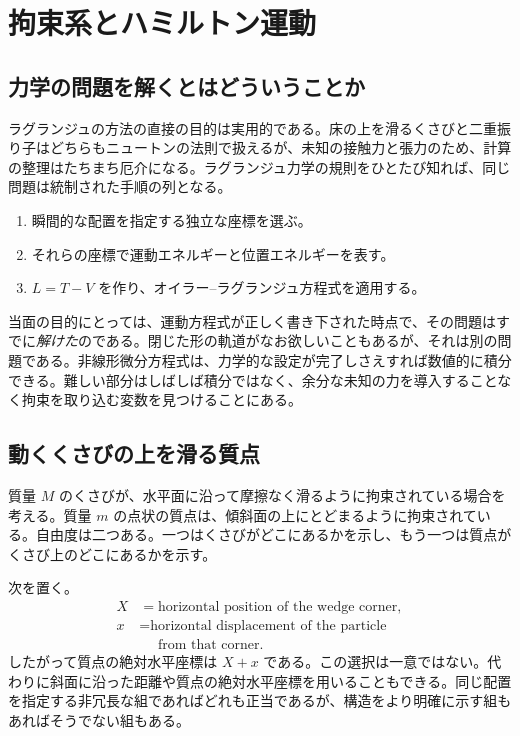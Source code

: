 \chapter{拘束系とハミルトン運動}


\section{力学の問題を解くとはどういうことか}

ラグランジュの方法の直接の目的は実用的である。床の上を滑るくさびと二重振り子はどちらもニュートンの法則で扱えるが、未知の接触力と張力のため、計算の整理はたちまち厄介になる。ラグランジュ力学の規則をひとたび知れば、同じ問題は統制された手順の列となる。
\begin{enumerate}
  \item 瞬間的な配置を指定する独立な座標を選ぶ。
  \item それらの座標で運動エネルギーと位置エネルギーを表す。
  \item \(L=T-V\) を作り、オイラー--ラグランジュ方程式を適用する。
\end{enumerate}

当面の目的にとっては、運動方程式が正しく書き下された時点で、その問題はすでに\emph{解けた}のである。閉じた形の軌道がなお欲しいこともあるが、それは別の問題である。非線形微分方程式は、力学的な設定が完了しさえすれば数値的に積分できる。難しい部分はしばしば積分ではなく、余分な未知の力を導入することなく拘束を取り込む変数を見つけることにある。

\section{動くくさびの上を滑る質点}

質量 \(M\) のくさびが、水平面に沿って摩擦なく滑るように拘束されている場合を考える。質量 \(m\) の点状の質点は、傾斜面の上にとどまるように拘束されている。自由度は二つある。一つはくさびがどこにあるかを示し、もう一つは質点がくさび上のどこにあるかを示す。

次を置く。
\begin{equation}
  \begin{aligned}
    X&=\text{horizontal position of the wedge corner},\\
    x&=\text{horizontal displacement of the particle}\\[-0.2em]
     &\phantom{={}}\text{from that corner}.
  \end{aligned}
  \label{eq:l6-wedge-coordinates}
\end{equation}
したがって質点の絶対水平座標は \(X+x\) である。この選択は一意ではない。代わりに斜面に沿った距離や質点の絶対水平座標を用いることもできる。同じ配置を指定する非冗長な組であればどれも正当であるが、構造をより明確に示す組もあればそうでない組もある。

